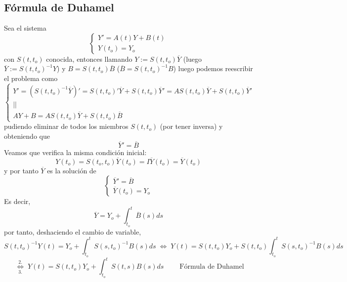     \subsection{Fórmula de Duhamel}
    Sea el sistema 
    $$\left\{\begin{array}{l}
                Y'=A(t)Y+B(t)  \\
                Y(t_o)=Y_o 
             \end{array} \right.$$
             con $S(t,t_o)$ conocida, entonces llamando $Y:=S(t,t_o) \overline{Y}$ (luego $\overline{Y}:=S(t,t_o)^{-1}Y$) y $B=S(t,t_o) \overline{B}$ ($\overline{B}=S(t,t_o)^{-1}B$) luego podemos reescribir el problema como 
    $$\left\{\begin{array}{l}
                Y'=(S(t,t_o)^{-1} \overline{Y})'=S(t,t_o)' \overline{Y} + S(t,t_o)\overline{Y}'=AS(t,t_o) \overline{Y} +S(t,t_o) \overline{Y}' \\
                ||\\
                AY+B=AS(t,t_o)\overline{Y}+S(t,t_o)\overline{B}
             \end{array} \right.$$
             pudiendo eliminar de todos los miembros $S(t,t_o)$ (por tener inversa) y obteniendo que $$\overline{Y}'=\overline{B}$$
             Veamos que verifica la misma condición inicial:
             $$Y(t_o)=S(t_o,t_o)\overline{Y}(t_o)=I\overline{Y}(t_o)=\overline{Y}(t_o)$$
             y por tanto $\overline{Y}$ es la solución de 
             $$\left\{ \begin{array}{l}
                  \overline{Y}'=\overline{B}  \\
                  \overline{Y}(t_o)=Y_o                  
             \end{array} \right.$$
             Es decir, 
             $$\overline{Y}=Y_o+\int_{t_o}^t \overline{B}(s)ds$$
             por tanto, deshaciendo el cambio de variable,
             $$S(t,t_o)^{-1}Y(t)=Y_o+\int_{t_o}^t S(s,t_o)^{-1} B(s) ds \; \iff \; Y(t)=S(t,t_o)Y_o+S(t,t_o) \int_{t_o}^t S(s,t_o)^{-1} B(s) ds $$
             $$ \; \underset{3.}{\overset{2.}{\iff}} \; \boxed{Y(t)=S(t,t_o)Y_o+\int_{t_o}^t S(t,s) B(s) ds \; } \qquad \text{Fórmula de Duhamel}$$
             

